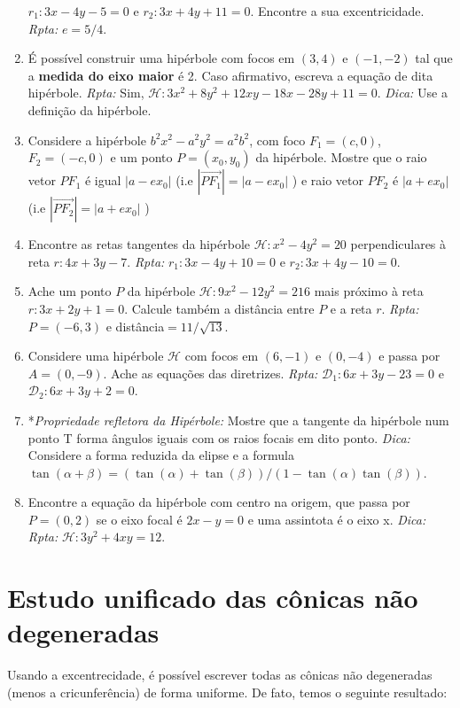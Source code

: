 \documentclass{article}
\begin{document}
\begin{enumerate}
    $r_1: 3x-4y-5=0$ e $r_2: 3x+4y+11=0$. 
    Encontre a sua excentricidade. {\it Rpta: } $e=5/4$. 
    \item É possível construir uma hipérbole com focos em 
    $(3,4)$ e $(-1,-2)$ tal que a {\bf medida do eixo maior} é 2.
    Caso afirmativo, escreva a equação de dita hipérbole.
    {\it Rpta: } Sim, $\mathcal{H}: 3x^2+8y^2+12xy-18x-28y+11=0$.
    {\it Dica: } Use a definição da hipérbole. 
    \item Considere a hipérbole $b^2x^2-a^2y^2=a^2b^2$, com 
    foco $F_1=(c,0)$, $F_2=(-c,0)$ e um ponto 
    $P=(x_0,y_0)$ da hipérbole. Mostre que 
    o raio vetor $PF_1$ é igual $|a-ex_0|$ 
    (i.e $|\overrightarrow{PF_1}|=|a-ex_0|$ )
    e  raio vetor $PF_2$ é $|a+ex_0|$ 
    (i.e $|\overrightarrow{PF_2}|=|a+ex_0|$ )
    \item Encontre as retas tangentes da hipérbole
    $\mathcal{H}: x^2-4y^2=20$ perpendiculares à
    reta $r: 4x+3y-7$. {\it Rpta: } 
    $r_1: 3x-4y+10=0$ e $r_2: 3x+4y-10=0$.
    \item Ache um ponto $P$ da hipérbole $\mathcal{H}: 9x^2-12y^2=216$
    mais próximo à reta $r: 3x+2y+1=0$. Calcule também a distância entre 
    $P$ e a reta $r$. {\it Rpta: } $P=(-6,3)$ e distância$=11/\sqrt{13}$.
    \item Considere uma hipérbole $\mathcal{H}$ com focos 
    em $(6,-1)$ e $(0,-4)$ e passa por $A=(0,-9)$. 
    Ache as equações das diretrizes.
    {\it Rpta: } 
    $\mathcal{D}_1:6x+3y-23=0$
    e 
    $\mathcal{D}_2:6x+3y+2=0$.
    \item *{\it Propriedade refletora da Hipérbole: } Mostre que a tangente da hipérbole num ponto T forma ângulos iguais com os raios focais em dito ponto. 
    {\it Dica: } 
    Considere a forma reduzida da elipse e 
    a formula $\tan(\alpha+\beta)=(\tan(\alpha)+\tan(\beta))/(1-\tan(\alpha)\tan(\beta))$.  
    \item Encontre a equação da hipérbole com centro na origem, 
    que passa por $P=(0,2)$ se o eixo focal é $2x-y=0$ 
    e uma assintota é o eixo x. {\it Dica: }
    {\it Rpta: } $\mathcal{H}: 3y^2+4xy=12$.
 \end{enumerate} 
 
 \section*{Estudo unificado das cônicas não degeneradas}
Usando a excentrecidade, é possível escrever todas as cônicas não degeneradas (menos a cricunferência) de forma uniforme. De fato, temos o seguinte resultado:
\end{document}
